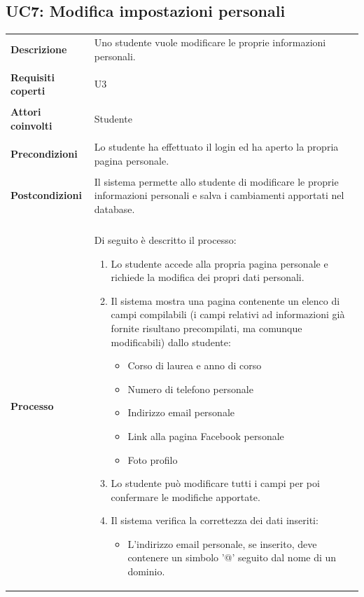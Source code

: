\documentclass[10pt,a4paper]{article}
\begin{document}
	\subsection{UC7: Modifica impostazioni personali}
	\begin{tabular}{lp{}}
		\textbf{Descrizione}&Uno studente vuole modificare le proprie informazioni personali.\\
		\\
		\textbf{Requisiti coperti}&U3\\
		\\
		\textbf{Attori coinvolti}&Studente\\
		\\
		\textbf{Precondizioni}&Lo studente ha effettuato il login ed ha aperto la propria pagina personale.\\
		\\
		\textbf{Postcondizioni}&Il sistema permette allo studente di modificare le proprie informazioni personali e salva i cambiamenti apportati nel database.\\
		\\
		\textbf{Processo}&Di seguito è descritto il processo:
		\begin{enumerate}
			\item Lo studente accede alla propria pagina personale e richiede la modifica dei propri dati personali.
			\item Il sistema mostra una pagina contenente un elenco di campi compilabili (i campi relativi ad informazioni già fornite risultano precompilati, ma comunque modificabili) dallo studente:
			\begin{itemize}
				\item Corso di laurea e anno di corso
				\item Numero di telefono personale
				\item Indirizzo email personale
				\item Link alla pagina Facebook personale
				\item Foto profilo
			\end{itemize}
			\item Lo studente può modificare tutti i campi per poi confermare le modifiche apportate.
			\item Il sistema verifica la correttezza dei dati inseriti:
			\begin{itemize}
				\item L'indirizzo email personale, se inserito, deve contenere un simbolo '@' seguito dal nome di un dominio.
			\end{itemize}

\end{enumerate}
\end{tabular}
\end{document}
